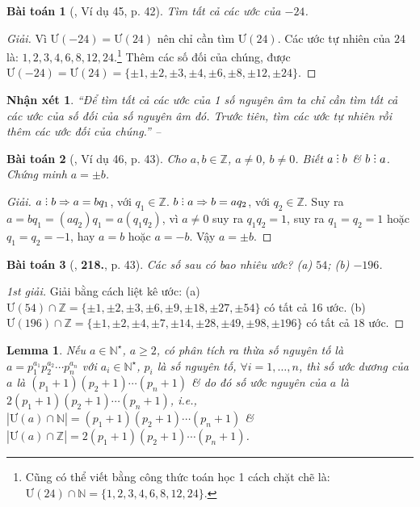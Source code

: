 \documentclass{article}
\numberwithin{equation}{section}
\newtheorem{baitoan}{Bài toán}
\newtheorem{lemma}{Lemma}[section]
\newtheorem{nhanxet}{Nhận xét}[section]
\DeclareRobustCommand{\divby}{%
	\mathrel{\vbox{\baselineskip.65ex\lineskiplimit0pt\hbox{.}\hbox{.}\hbox{.}}}%
}
\begin{document}
\begin{baitoan}[\cite{Tuyen_Toan_6}, Ví dụ 45, p. 42]
	Tìm tất cả các ước của $-24$.
\end{baitoan}

\begin{proof}[Giải]
	Vì $\mbox{Ư}(-24) = \mbox{Ư}(24)$ nên chỉ cần tìm $\mbox{Ư}(24)$. Các ước tự nhiên của $24$ là: $1,2,3,4,6,8,12,24$.\footnote{Cũng có thể viết bằng công thức toán học 1 cách chặt chẽ là: $\mbox{Ư}(24)\cap\mathbb{N} = \{1,2,3,4,6,8,12,24\}$.} Thêm các số đối của chúng, được $\mbox{Ư}(-24) = \mbox{Ư}(24) = \{\pm1,\pm2,\pm3,\pm4,\pm6,\pm8,\pm12,\pm24\}$.
\end{proof}

\begin{nhanxet}
	``Để tìm tất cả các ước của 1 số nguyên âm ta chỉ cần tìm tất cả các ước của số đối của số nguyên âm đó. Trước tiên, tìm các ước tự nhiên rồi thêm các ước đối của chúng.'' -- \cite[p. 42]{Tuyen_Toan_6}
\end{nhanxet}

\begin{baitoan}[\cite{Tuyen_Toan_6}, Ví dụ 46, p. 43]
	Cho $a,b\in\mathbb{Z}$, $a\ne0$, $b\ne0$. Biết $a\divby b$ \& $b\divby a$. Chứng minh $a = \pm b$.
\end{baitoan}

\begin{proof}[Giải]
	$a\divby b\Rightarrow a = bq_1$, với $q_1\in\mathbb{Z}$. $b\divby a\Rightarrow b = aq_2$, với $q_2\in\mathbb{Z}$. Suy ra $a = bq_1 = (aq_2)q_1 = a(q_1q_2)$, vì $a\ne0$ suy ra $q_1q_2 = 1$, suy ra $q_1 = q_2 = 1$ hoặc $q_1 = q_2 = -1$, hay $a = b$ hoặc $a = -b$. Vậy $a = \pm b$.
\end{proof}

\begin{baitoan}[\cite{Tuyen_Toan_6}, \textbf{218.}, p. 43]
	Các số sau có bao nhiêu ước? (a) $54$; (b) $-196$.
\end{baitoan}

\begin{proof}[1st giải]
	Giải bằng cách liệt kê ước: (a) $\mbox{Ư}(54)\cap\mathbb{Z} = \{\pm1,\pm2,\pm3,\pm6,\pm9,\pm18,\pm27,\pm54\}$ có tất cả 16 ước. (b) $\mbox{Ư}(196)\cap\mathbb{Z} = \{\pm1,\pm2,\pm4,\pm7,\pm14,\pm28,\pm49,\pm98,\pm196\}$ có tất cả $18$ ước.
\end{proof}

\begin{lemma}
	\label{lemma: number of divisor}
	Nếu $a\in\mathbb{N}^\star$, $a\ge2$, có phân tích ra thừa số nguyên tố là $a = p_1^{a_1}p_2^{a_2}\cdots p_n^{a_n}$ với $a_i\in\mathbb{N}^\star$, $p_i$ là số nguyên tố, $\forall i = 1,\ldots,n$, thì số ước dương của $a$ là $(p_1 + 1)(p_2 + 1)\cdots(p_n + 1)$ \& do đó số ước nguyên của $a$ là $2(p_1 + 1)(p_2 + 1)\cdots(p_n + 1)$, i.e., $|\mbox{Ư}(a)\cap\mathbb{N}| = (p_1 + 1)(p_2 + 1)\cdots(p_n + 1)$ \& $|\mbox{Ư}(a)\cap\mathbb{Z}| = 2(p_1 + 1)(p_2 + 1)\cdots(p_n + 1)$.
\end{lemma}
\end{document}
